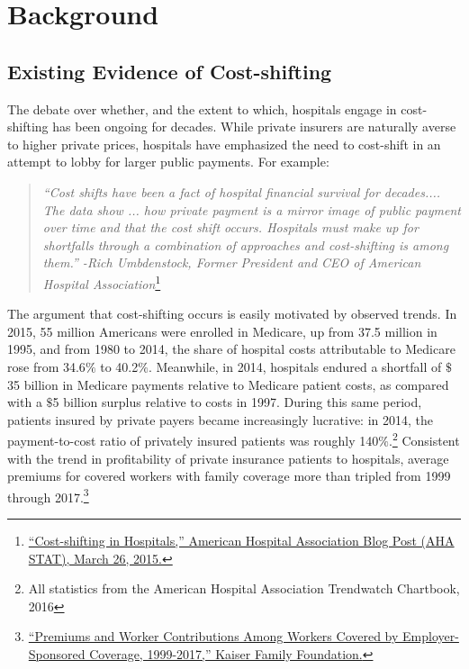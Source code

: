 \documentclass[12pt]{article}
\begin{document}
\section{Background}
\label{sec:Background}

\subsection{Existing Evidence of Cost-shifting}
The debate over whether, and the extent to which, hospitals engage in cost-shifting has been ongoing for decades. While private insurers are naturally averse to higher private prices, hospitals have emphasized the need to cost-shift in an attempt to lobby for larger public payments. For example:
\begin{quote}
\textit{``Cost shifts have been a fact of hospital financial survival for decades.... The data show ...  how private payment is a mirror image of public payment over time and that the cost shift occurs. Hospitals must make up for shortfalls through a combination of approaches and cost-shifting is among them.'' -Rich Umbdenstock, Former President and CEO of American Hospital Association}\footnote{\href{http://blog.aha.org/post/costshifting-in-hospitals-}{``Cost-shifting in Hospitals,'' American Hospital Association Blog Post (AHA STAT), March 26, 2015.}}
\end{quote}

The argument that cost-shifting occurs is easily motivated by observed trends.  In 2015, 55 million Americans were enrolled in Medicare, up from 37.5 million in 1995, and from 1980 to 2014, the share of hospital costs attributable to Medicare rose from 34.6$\%$ to 40.2$\%$.  Meanwhile, in 2014, hospitals endured a shortfall of $\$$35 billion in Medicare payments relative to Medicare patient costs, as compared with a $\$$5 billion surplus relative to costs in 1997.  During this same period, patients insured by private payers became increasingly lucrative: in 2014, the payment-to-cost ratio of privately insured patients was roughly 140$\%$.\footnote{All statistics from the American Hospital Association Trendwatch Chartbook, 2016} Consistent with the trend in profitability of private insurance patients to hospitals, average premiums for covered workers with family coverage more than tripled from 1999 through 2017.\footnote{\href{https://www.kff.org/interactive/premiums-and-worker-contributions/?coverageGroup=family}{``Premiums and Worker Contributions Among Workers Covered by Employer-Sponsored Coverage, 1999-2017,'' Kaiser Family Foundation.}}
\end{document}
